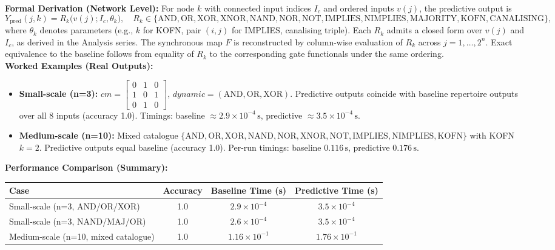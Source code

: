 \documentclass{article}
\begin{document}
\textbf{Formal Derivation (Network Level):} For node \(k\) with connected input indices \(I_c\) and ordered inputs \(v(j)\), the predictive output is
\[
Y_{\mathrm{pred}}(j,k) = R_k\big(v(j); I_c, \theta_k\big),\quad R_k \in \{\text{AND},\text{OR},\text{XOR},\text{XNOR},\text{NAND},\text{NOR},\text{NOT},\text{IMPLIES},\text{NIMPLIES},\text{MAJORITY},\text{KOFN},\text{CANALISING}\},
\]
where \(\theta_k\) denotes parameters (e.g., \(k\) for KOFN, pair \((i,j)\) for IMPLIES, canalising triple). Each \(R_k\) admits a closed form over \(v(j)\) and \(I_c\), as derived in the Analysis series. The synchronous map \(F\) is reconstructed by column-wise evaluation of \(R_k\) across \(j=1,\dots,2^n\). Exact equivalence to the baseline follows from equality of \(R_k\) to the corresponding gate functionals under the same ordering.\\
\textbf{Worked Examples (Real Outputs):}
\begin{itemize}
 \item \textbf{Small-scale (n=3):} \(cm=\begin{bmatrix}0&1&0\\1&0&1\\0&1&0\end{bmatrix}\), \(dynamic=(\mathrm{AND},\mathrm{OR},\mathrm{XOR})\). Predictive outputs coincide with baseline repertoire outputs over all 8 inputs (accuracy 1.0). Timings: baseline \(\approx 2.9\times 10^{-4}\,\mathrm{s}\), predictive \(\approx 3.5\times 10^{-4}\,\mathrm{s}\).
 \item \textbf{Medium-scale (n=10):} Mixed catalogue \(\{\mathrm{AND}, \mathrm{OR}, \mathrm{XOR}, \mathrm{NAND}, \mathrm{NOR}, \mathrm{XNOR}, \mathrm{NOT}, \mathrm{IMPLIES}, \mathrm{NIMPLIES}, \mathrm{KOFN}\}\) with KOFN \(k=2\). Predictive outputs equal baseline (accuracy 1.0). Per-run timings: baseline \(0.116\,\mathrm{s}\), predictive \(0.176\,\mathrm{s}\).
\end{itemize}
\textbf{Performance Comparison (Summary):}
\begin{center}
\begin{tabular}{lccc}
\toprule
\textbf{Case} & \textbf{Accuracy} & \textbf{Baseline Time (s)} & \textbf{Predictive Time (s)} \\
\midrule
Small-scale (n=3, AND/OR/XOR) & 1.0 & $2.9\times 10^{-4}$ & $3.5\times 10^{-4}$ \\
Small-scale (n=3, NAND/MAJ/OR) & 1.0 & $2.6\times 10^{-4}$ & $3.5\times 10^{-4}$ \\
Medium-scale (n=10, mixed catalogue) & 1.0 & $1.16\times 10^{-1}$ & $1.76\times 10^{-1}$ \\
\bottomrule
\end{tabular}
\end{center}
\end{document}
